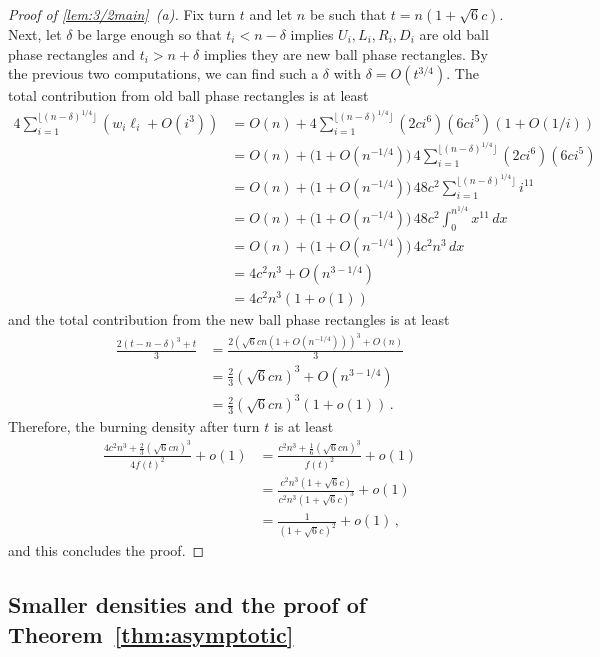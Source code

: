 \documentclass[12pt]{article}
\theoremstyle{remark}
\begin{document}
\begin{proof}[Proof of \cref{lem:3/2main}~(a)]
Fix turn $t$ and let $n$ be such that $t = n(1+\sqrt{6}c)$. Next, let $\delta$ be large enough so that $t_i < n-\delta$ implies $U_i, L_i, R_i, D_i$ are old ball phase rectangles and $t_i > n+\delta$ implies they are new ball phase rectangles. By the previous two computations, we can find such a $\delta$ with $\delta = O(t^{3/4})$. The total contribution from old ball phase rectangles is at least
\begin{align*}
4 \sum_{i=1}^{\lfloor(n-\delta)^{1/4}\rfloor} \left(w_i \ell_i + O\left( i^3 \right)\right)
&=
O(n) + 4 \sum_{i=1}^{\lfloor(n-\delta)^{1/4}\rfloor}\left(2ci^6\right) \left(6ci^5\right) (1+O(1/i))\\
&=
O(n) + \bigl(1+O(n^{-1/4})\bigr) \, 4 \sum_{i=1}^{\lfloor(n-\delta)^{1/4}\rfloor}\left(2ci^6\right) \left(6ci^5\right) \\
&=
O(n) + \bigl(1+O(n^{-1/4})\bigr) \, 48c^2 \sum_{i=1}^{\lfloor(n-\delta)^{1/4}\rfloor} i^{11}\\
&=
O(n) + \bigl(1+O(n^{-1/4})\bigr) \, 48c^2 \int_0^{n^{1/4}} x^{11} \, dx\\
&=
O(n) + \bigl(1+O(n^{-1/4})\bigr) \, 4c^2 n^3 \, dx\\
&= 4c^2 n^3 + O(n^{3-1/4})\\
&= 4c^2 n^3 (1+o(1))
\end{align*}
and the total contribution from the new ball phase rectangles is at least
\begin{align*}
\frac{2(t-n-\delta)^3 + t}{3}
&=
\frac{2(\sqrt{6}cn (1+O(n^{-1/4})))^3 + O(n)}{3}\\
&=
\frac{2}{3} (\sqrt{6}cn)^3 + O(n^{3-1/4})\\
&=
\frac{2}{3} (\sqrt{6}cn)^3 (1+o(1)) \,.
\end{align*}
Therefore, the burning density after turn $t$ is at least 
\begin{align*}
\frac{4c^2n^3 + \frac{2}{3}(\sqrt{6}cn)^3}{4f(t)^2} + o(1)
&=
\frac{c^2n^3 + \frac{1}{6}(\sqrt{6}cn)^3}{f(t)^2} + o(1)\\
&=
\frac{c^2n^3(1+\sqrt{6}c)}{c^2n^3(1+\sqrt{6}c)^3} + o(1)\\
&=
\frac{1}{(1+\sqrt{6}c)^2} + o(1) \,,
\end{align*}
and this concludes the proof. 
\end{proof}

\subsection{Smaller densities and the proof of Theorem~\ref{thm:asymptotic}} \label{sec:inbetween}
\end{document}
